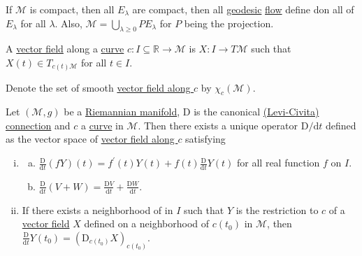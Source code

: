 \begin{remark}
	If \(\mathcal{M} \) is compact, then all \(E_\lambda \) are compact, then all \hyperref[def:geodesic]{geodesic} \hyperref[def:local-flow]{flow} define don all of \(E_\lambda \) for all \(\lambda \). Also, \(\mathcal{M} = \bigcup_{\lambda \geq 0} P E_\lambda \) for \(P\) being the projection.
\end{remark}

\begin{definition}\label{def:vector-field-along-a-curve}
	A \hyperref[def:vector-field]{vector field} along a \hyperref[def:curve]{curve} \(c\colon I \subseteq \mathbb{R} \to \mathcal{M} \) is \(X\colon I \to T \mathcal{M} \) such that \(X(t)\in T_{c(t) \mathcal{M} }\) for all \(t\in I\).
\end{definition}

\begin{notation}
	Denote the set of smooth \hyperref[def:vector-field-along-a-curve]{vector field along \(c\)}  by \(\chi _c(\mathcal{M} )\).
\end{notation}

\begin{theorem}\label{thm:lec11}
	Let \((\mathcal{M} , g)\) be a \hyperref[def:Riemannian-manifold]{Riemannian manifold}, \(\mathrm{D}\) is the canonical \hyperref[def:Levi-Civita-connection]{(Levi-Civita) connection} and \(c\) a \hyperref[def:curve]{curve} in \(\mathcal{M} \). Then there exists a unique operator \(\mathrm{D} / \mathrm{d} t\) defined as the vector space of \hyperref[def:vector-field-along-a-curve]{vector field along \(c\)} satisfying
	\begin{enumerate}[(i)]
		\item \label{thm:lec11-i}\begin{enumerate}[(a)]
			      \item \label{thm:lec11-i-a} \(\frac{\mathrm{D}}{\mathrm{d}t} (fY)(t) = f^\prime (t) Y(t) + f(t) \frac{\mathrm{D} }{\mathrm{d} t} Y(t)\) for all real function \(f\) on \(I\).
			      \item \label{thm:lec11-i-b} \(\frac{\mathrm{D} }{\mathrm{d} t} (V+W) = \frac{\mathrm{D} V}{\mathrm{d} t} + \frac{\mathrm{D} W}{\mathrm{d} t}\).
		      \end{enumerate}
		\item \label{thm:lec11-ii} If there exists a neighborhood of in \(I\) such that \(Y\) is the restriction to \(c\) of a \hyperref[def:vector-field]{vector field} \(X\) defined on a neighborhood of \(c(t_0)\) in \(\mathcal{M} \), then \(\frac{\mathrm{D} }{\mathrm{d} t} Y(t_0) = (\mathrm{D}_{c(t_0)} X) _{c(t_0)}\).
	\end{enumerate}
\end{theorem}

